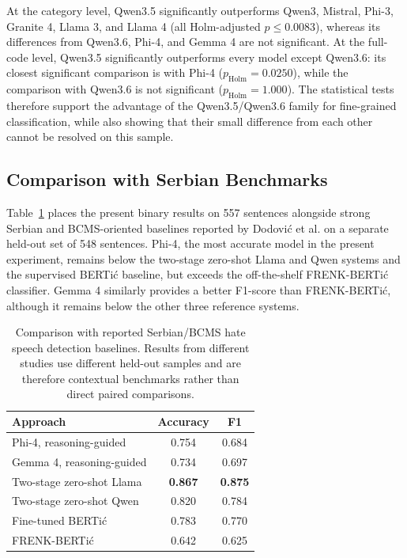 \documentclass[a4paper]{article}
\begin{document}
At the category level, Qwen3.5 significantly outperforms Qwen3, Mistral, Phi-3, Granite 4, Llama 3, and Llama 4 (all Holm-adjusted $p\leq0.0083$), whereas its differences from Qwen3.6, Phi-4, and Gemma 4 are not significant. At the full-code level, Qwen3.5 significantly outperforms every model except Qwen3.6: its closest significant comparison is with Phi-4 ($p_{\mathrm{Holm}}=0.0250$), while the comparison with Qwen3.6 is not significant ($p_{\mathrm{Holm}}=1.000$). The statistical tests therefore support the advantage of the Qwen3.5/Qwen3.6 family for fine-grained classification, while also showing that their small difference from each other cannot be resolved on this sample.

\subsection{Comparison with Serbian Benchmarks}

Table~\ref{tab:serbian_benchmarks} places the present binary results on 557 sentences alongside strong Serbian and BCMS-oriented baselines reported by Dodović et al. \cite{dodovic2026access} on a separate held-out set of 548 sentences. Phi-4, the most accurate model in the present experiment, remains below the two-stage zero-shot Llama and Qwen systems and the supervised BERTić baseline, but exceeds the off-the-shelf FRENK-BERTić classifier. Gemma 4 similarly provides a better F1-score than FRENK-BERTić, although it remains below the other three reference systems.

\begin{table}[t]
\centering
\caption{Comparison with reported Serbian/BCMS hate speech detection baselines. Results from different studies use different held-out samples and are therefore contextual benchmarks rather than direct paired comparisons.}
\label{tab:serbian_benchmarks}
\small
\renewcommand{\arraystretch}{1.16}
\setlength{\tabcolsep}{4pt}
\begin{tabular}{lcc}
\toprule
\textbf{Approach} & \textbf{Accuracy} & \textbf{F1} \\
\midrule
Phi-4, reasoning-guided       & 0.754 & 0.684 \\
Gemma 4, reasoning-guided     & 0.734 & 0.697 \\
Two-stage zero-shot Llama \cite{dodovic2026access} & \textbf{0.867} & \textbf{0.875} \\
Two-stage zero-shot Qwen \cite{dodovic2026access}  & 0.820 & 0.784 \\
Fine-tuned BERTić \cite{dodovic2026access}        & 0.783 & 0.770 \\
FRENK-BERTić \cite{dodovic2026access}             & 0.642 & 0.625 \\
\bottomrule
\end{tabular}
\end{table}
\end{document}
